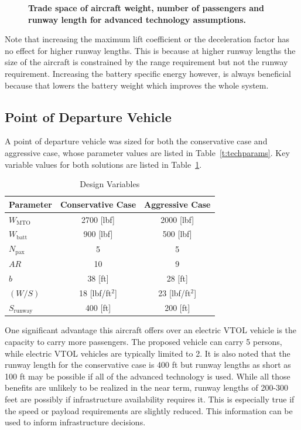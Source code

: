 \documentclass[]{aiaa-tc}%
\begin{document}
\begin{figure}[h!]
\begin{subfigmatrix}{3}
 \end{subfigmatrix}
    \caption{\textbf{Trade space of aircraft weight, number of passengers and runway length for advanced technology assumptions.}}
 \label{f:tech}
\end{figure}

Note that increasing the maximum lift coefficient or the deceleration factor has no effect for higher runway lengths.  
This is because at higher runway lengths the size of the aircraft is constrained by the range requirement but not the runway requirement. 
Increasing the battery specific energy however, is always beneficial because that lowers the battery weight which improves the whole system. 

\subsection{Point of Departure Vehicle}

A point of departure vehicle was sized for both the conservative case and aggressive case, whose parameter values are listed in Table~\ref{t:techparams}.  
Key variable values for both solutions are listed in Table~\ref{t:pod}.

\begin{table}[H]
    \centering
    \caption{Design Variables}
    \label{t:pod}
    \begin{tabular}{l c c}
    \toprule
    \toprule
    Parameter                   & Conservative Case  & Aggressive Case \\ \hline
    $W_{\mathrm{MTO}}$          & 2700 [lbf]         & 2000 [lbf] \\
    $W_{\mathrm{batt}}$         & 900 [lbf]          & 500 [lbf] \\
    $N_{\mathrm{pax}}$          & 5                  & 5  \\
    $AR$                        & 10                 & 9 \\
    $b$                         & 38 [ft]            & 28 [ft] \\
    $(W/S)$                     & 18 [lbf/ft$^2$]    & 23 [lbf/ft$^2$] \\
    $S_{\mathrm{runway}}$       & 400 [ft]           & 200 [ft] \\
    \bottomrule
\end{tabular}
\end{table}

One significant advantage this aircraft offers over an electric VTOL vehicle is the capacity to carry more passengers.  The proposed vehicle can carry 5 persons, while electric VTOL vehicles are typically limited to 2.  
It is also noted that the runway length for the conservative case is 400 ft but runway lengths as short as 100 ft may be possible if all  of the advanced technology is used.  While all those benefits are unlikely to be realized in the near term, runway lengths of 200-300 feet are possibly if infrastructure availability requires it.  This is especially true if the speed or payload requirements are slightly reduced.  
This information can be used to inform infrastructure decisions.  
\end{document}
